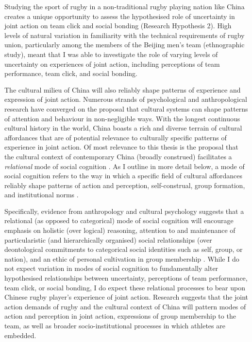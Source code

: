 \begin{CJK}{UTF8}{gbsn}
Studying the sport of rugby in a non-traditional rugby playing nation like China creates a unique opportunity to assess the hypothesised role of uncertainty in joint action on team click and social bonding (Research Hypothesis 2). High levels of natural variation in familiarity with the technical requirements of rugby union, particularly among the members of the Beijing men's team (ethnographic study), meant that I was able to investigate the role of varying levels of uncertainty on experiences of joint action, including perceptions of team performance, team click, and social bonding.

The cultural milieu of China will also reliably shape patterns of experience and expression of joint action.  Numerous strands of psychological and anthropological research have converged on the proposal that cultural systems can shape patterns of attention and behaviour in non-negligible ways.  With the longest continuous cultural history in the world, China boasts a rich and diverse terrain of cultural affordances that are of potential relevance to culturally specific patterns of experience in joint action.  Of most relevance to this thesis is the proposal that the cultural context of contemporary China (broadly construed) facilitates a \textit{relational} mode of social cognition \citep{Nisbett2003,Yuki2005}.  As I outline in more detail below, a mode of social cognition refers to the way in which a specific field of cultural affordances reliably shape patterns of action and perception, self-construal, group formation, and institutional norms \citep{Nisbett2003a}.

Specifically, evidence from anthropology and cultural psychology suggests that a relational (as opposed to categorical) mode of social cognition will encourage emphasis on holistic (over logical) reasoning, attention to and maintenance of particularistic (and hierarchically organised) social relationships (over deontological commitments to categorical social identities such as self, group, or nation), and an ethic of personal cultivation in group membership \citep[over an ethic of self-less egalitarianism; see][]{Liu2009}.  While I do not expect variation in modes of social cognition to fundamentally alter hypothesised relationships between uncertainty, perceptions of team performance, team click, or social bonding, I do expect these relational processes to bear upon Chinese rugby player's experience of joint action. Research suggests that the joint action demands of rugby and the cultural context of China will pattern modes of action and perception in joint action, expressions of group membership to the team, as well as broader socio-institutional processes in which athletes are embedded.


\end{CJK}

